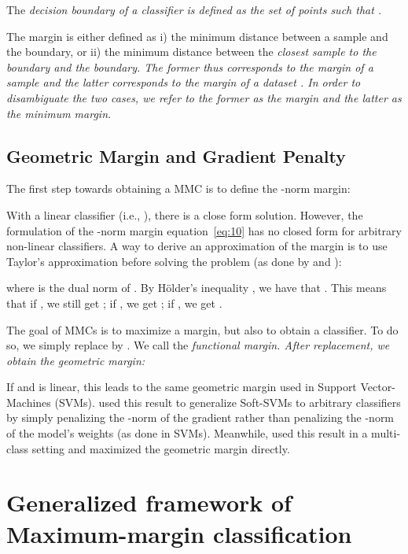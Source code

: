 \documentclass{article}
\def\eqref#1{equation~\ref{#1}}
\begin{document}
The \em decision boundary \em of a classifier is defined as the set of points  such that .

The margin is either defined as
i) the minimum distance between a sample and the boundary, or
ii) the minimum distance between the \em closest sample \em to the boundary and the boundary.
The former thus corresponds to the \em margin of a sample \em and the latter corresponds to the \em margin of a dataset \em.
In order to disambiguate the two cases, we refer to the former as the \em margin \em and the latter as the \em minimum margin\em.

\subsection{Geometric Margin and Gradient Penalty}

The first step towards obtaining a  MMC is to define the -norm margin:


With a linear classifier (i.e., ), there is a close form solution. However, the formulation of the -norm margin \eqref{eq:10} has no closed form for arbitrary non-linear classifiers. A way to derive an approximation of the margin is to use Taylor's approximation before solving the problem (as done by \citet{matyasko2017margin} and \citet{elsayed2018large}):

where  is the dual norm \citep{boyd2004convex} of . By Hölder's inequality \citep{holder1889ueber, rogers1888extension}, we have that . This means that if , we still get ; if , we get ; if , we get .

The goal of MMCs is to maximize a margin, but also to obtain a classifier. To do so, we simply replace  by . We call  the \em functional margin\em. After replacement, we obtain the \em geometric margin\em:


If  and  is linear, this leads to the same geometric margin used in Support Vector-Machines (SVMs). \citet{matyasko2017margin} used this result to generalize Soft-SVMs to arbitrary classifiers by simply penalizing the -norm of the gradient rather than penalizing the -norm of the model's weights (as done in SVMs). Meanwhile, \citet{elsayed2018large} used this result in a multi-class setting and maximized the geometric margin directly.

\section{Generalized framework of Maximum-margin classification}
\label{sec:4}
\end{document}

